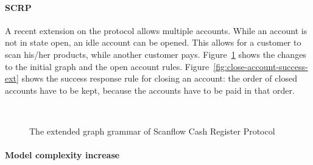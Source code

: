 \paragraph*{SCRP}
A recent extension on the protocol allows multiple accounts. While an account is not in state open, an idle account can be opened. This allows for a customer to scan his/her products, while another customer pays. Figure~\ref{fig:gg-fwgc-extended} shows the changes to the initial graph and the open account rules. Figure~\ref{fig:close-account-success-ext} shows the success response rule for closing an account: the order of closed accounts have to be kept, because the accounts have to be paid in that order.

\begin{figure}[ht]
  \begin{center}
    \hspace{20px}
    \\
    \hspace{20px}
  \end{center}
  \caption{The extended graph grammar of Scanflow Cash Register Protocol}
  \label{fig:gg-fwgc-extended}
\end{figure}

\paragraph*{Model complexity increase}
\begin{comment}
1:
IOGG:
This extension reduces the distinct number of operators by 1 and introduces no new operands. The number of operator occurences has decreased by 1 and the number of operand occurences has grown by 10.
IOSTS:
The distinct number of operators has not increased and the distinct number of operands has increased by 1. The number of operator occurences has increased by 9 and the number of operand occurences has increased by 17.

model complexity 1
The volume of the IOGG has increased by 35.95. $n_1 = 8, n_2 = 18, N_1 = 23, N_2 = 113$ Volume is 136*4.70 = 639.20
The volume of the IOSTS has increased by 130.28. $n_1 = 5, n_2 = 23, N_1 = 34, N_2 = 79$ Volume is 113*4.81 = 543.53

2:
IOGG:
\end{comment}


